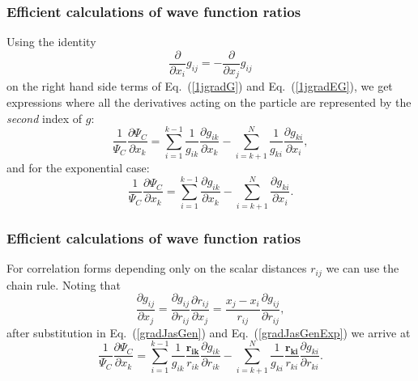 \documentclass[compress]{beamer}
\newcommand{\bfv}[1]{\boldsymbol{#1}}                     %
\begin{document}
\frame
 {
   \frametitle{Efficient calculations of wave function ratios}
 \begin{small}
 {\scriptsize
Using the identity 
\begin{equation}\label{firstDerIdentity}
\frac{\partial}{\partial x_i}g_{ij} = -\frac{\partial}{\partial x_j}g_{ij} 
\end{equation}
on the right hand side terms of Eq.~(\ref{1jgradG}) and Eq.~(\ref{1jgradEG}), we get expressions where all the derivatives acting on the particle  are represented by the
\emph{second} index of $g$:
\begin{equation}\label{gradJasGen}
\boxed{
\frac{1}{\Psi_C}\frac{\partial \Psi_C}{\partial x_k} =
\sum_{i=1}^{k-1}\frac{1}{g_{ik}}\frac{\partial g_{ik}}{\partial x_k}
-
\sum_{i=k+1}^{N}\frac{1}{g_{ki}}\frac{\partial g_{ki}}{\partial x_i},
}
\end{equation}
and for the exponential case:
\begin{equation}\label{gradJasGenExp}
\boxed{
\frac{1}{\Psi_C}\frac{\partial \Psi_C}{\partial x_k} =
\sum_{i=1}^{k-1}\frac{\partial g_{ik}}{\partial x_k}
-
\sum_{i=k+1}^{N}\frac{\partial g_{ki}}{\partial x_i}.
}
\end{equation}
 }
 \end{small}
 }
\frame
 {
   \frametitle{Efficient calculations of wave function ratios}
 \begin{small}
 {\scriptsize

For correlation forms depending only on the scalar distances $r_{ij}$ we can use the chain rule. Noting that 
\begin{equation}\label{chainRule}
\frac{\partial g_{ij}}{\partial x_j} = \frac{\partial g_{ij}}{\partial r_{ij}} \frac{\partial r_{ij}}{\partial x_j} = \frac{x_j - x_i}{r_{ij}} \frac{\partial g_{ij}}{\partial r_{ij}},
\end{equation}
after substitution in Eq.~(\ref{gradJasGen}) and Eq.~(\ref{gradJasGenExp}) we arrive at
\begin{equation}\label{generalCorrelation}
\boxed{
\frac{1}{\Psi_C}\frac{\partial \Psi_C}{\partial x_k} = 
\sum_{i=1}^{k-1}\frac{1}{g_{ik}} \frac{\bfv{r_{ik}}}{r_{ik}} \frac{\partial g_{ik}}{\partial r_{ik}}
-
\sum_{i=k+1}^{N}\frac{1}{g_{ki}}\frac{\bfv{r_{ki}}}{r_{ki}}\frac{\partial g_{ki}}{\partial r_{ki}}.
}
\end{equation}
 }
 \end{small}
 }
\frame
\end{document}
